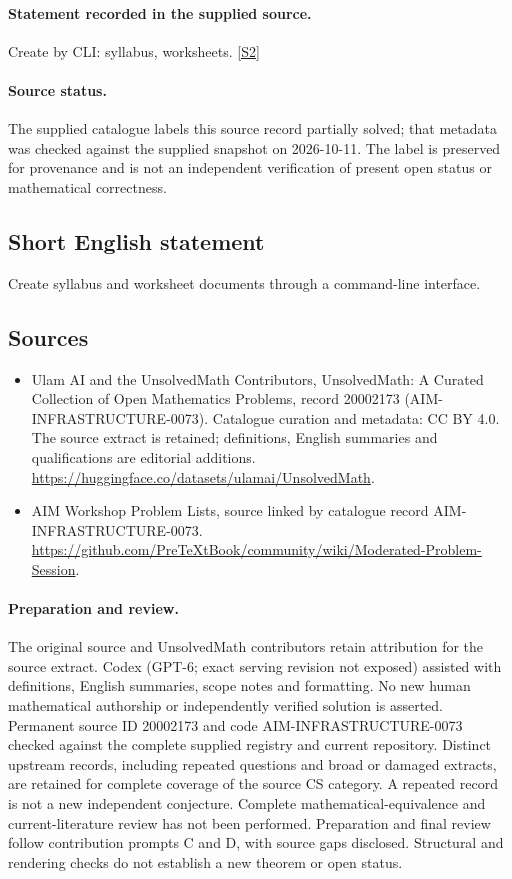 \documentclass[11pt]{article}
\begin{document}
\paragraph{Statement recorded in the supplied source.}
Create by CLI: syllabus, worksheets. \href{https://github.com/PreTeXtBook/community/wiki/Moderated-Problem-Session}{[S2]}
\paragraph{Source status.}
The supplied catalogue labels this source record partially solved; that metadata was checked against the supplied snapshot on 2026-10-11. The label is preserved for provenance and is not an independent verification of present open status or mathematical correctness.
\subsection{Short English statement}
Create syllabus and worksheet documents through a command-line interface.
\subsection{Sources}
\begin{itemize}
\item[S1] Ulam AI and the UnsolvedMath Contributors, UnsolvedMath: A Curated Collection of Open Mathematics Problems, record 20002173 (AIM-INFRASTRUCTURE-0073). Catalogue curation and metadata: CC BY 4.0. The source extract is retained; definitions, English summaries and qualifications are editorial additions.
\url{https://huggingface.co/datasets/ulamai/UnsolvedMath}.
\item[S2] AIM Workshop Problem Lists, source linked by catalogue record AIM-INFRASTRUCTURE-0073.
\url{https://github.com/PreTeXtBook/community/wiki/Moderated-Problem-Session}.
\end{itemize}
\paragraph{Preparation and review.}
The original source and UnsolvedMath contributors retain attribution for the source extract. Codex (GPT-6; exact serving revision not exposed) assisted with definitions, English summaries, scope notes and formatting. No new human mathematical authorship or independently verified solution is asserted. Permanent source ID 20002173 and code AIM-INFRASTRUCTURE-0073 checked against the complete supplied registry and current repository. Distinct upstream records, including repeated questions and broad or damaged extracts, are retained for complete coverage of the source CS category. A repeated record is not a new independent conjecture. Complete mathematical-equivalence and current-literature review has not been performed. Preparation and final review follow contribution prompts C and D, with source gaps disclosed. Structural and rendering checks do not establish a new theorem or open status.
\label{end:20002173}
\end{document}
